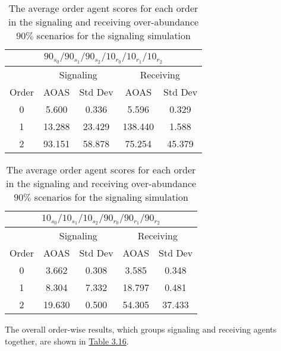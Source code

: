 \begin{table}[h]
    \centering
    \begin{tabular}{|c|c|c|c|c|}
    \hline
    \multicolumn{5}{|c|}{$90_{s_{0}}/90_{s_{1}}/90_{s_{2}}/10_{r_{0}}/10_{r_{1}}/10_{r_{2}}$} \\
    \hline
    \multicolumn{1}{|c|}{} & \multicolumn{2}{|c|}{Signaling} & \multicolumn{2}{|c|}{Receiving} \\
    \hline
    Order & AOAS & Std Dev & AOAS & Std Dev \\
    \hline
    0     & 5.600     & 0.336    & 5.596      & 0.329   \\
    1     & 13.288    & 23.429   & 138.440    & 1.588   \\
    2     & 93.151    & 58.878   & 75.254     & 45.379   \\
    \hline
    \end{tabular}
    \qquad
    \begin{tabular}{|c|c|c|c|c|}
    \hline
    \multicolumn{5}{|c|}{$10_{s_{0}}/10_{s_{1}}/10_{s_{2}}/90_{r_{0}}/90_{r_{1}}/90_{r_{2}}$} \\
    \hline
    \multicolumn{1}{|c|}{} & \multicolumn{2}{|c|}{Signaling} & \multicolumn{2}{|c|}{Receiving} \\
    \hline
    Order & AOAS & Std Dev & AOAS & Std Dev \\
    \hline
    0     & 3.662   & 0.308    & 3.585   & 0.348   \\
    1     & 8.304   & 7.332    & 18.797  & 0.481   \\
    2     & 19.630  & 0.500    & 54.305  & 37.433   \\
    \hline
    \end{tabular}
    \caption{The average order agent scores for each order in the signaling and receiving over-abundance $90\%$ scenarios for the signaling simulation}
    \label{table:sig-over-abundance-90}
\end{table}

The overall order-wise results, which groups signaling and receiving agents together, are shown in \hyperref[table:sig-overall-90]{Table 3.16}.

